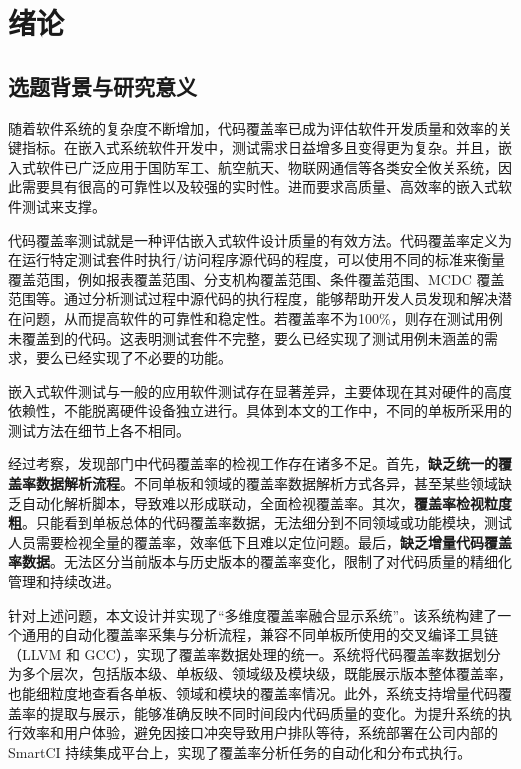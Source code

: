 
\chapter{绪论}

\section{选题背景与研究意义}
    随着软件系统的复杂度不断增加，代码覆盖率已成为评估软件开发质量和效率的关键指标。在嵌入式系统软件开发中，测试需求日益增多且变得更为复杂。并且，嵌入式软件已广泛应用于国防军工、航空航天、物联网通信等各类安全攸关系统，因此需要具有很高的可靠性以及较强的实时性\cite{杨丰玉2021嵌入式软件测试研究综述}\cite{孙琪明2025嵌入式软件模糊测试研究综述}。进而要求高质量、高效率的嵌入式软件测试来支撑。

    代码覆盖率测试就是一种评估嵌入式软件设计质量的有效方法。代码覆盖率定义为在运行特定测试套件时执行/访问程序源代码的程度，可以使用不同的标准来衡量覆盖范围，例如报表覆盖范围、分支机构覆盖范围、条件覆盖范围、MCDC 覆盖范围等\cite{Weiss2024AchievingCS}。通过分析测试过程中源代码的执行程度，能够帮助开发人员发现和解决潜在问题，从而提高软件的可靠性和稳定性。若覆盖率不为100\%，则存在测试用例未覆盖到的代码。这表明测试套件不完整，要么已经实现了测试用例未涵盖的需求，要么已经实现了不必要的功能\cite{Weiss2024AchievingCS}。
    
    嵌入式软件测试与一般的应用软件测试存在显著差异，主要体现在其对硬件的高度依赖性，不能脱离硬件设备独立进行\cite{刘栋2022基于覆盖率的嵌入式软件测试方法研究}。具体到本文的工作中，不同的单板所采用的测试方法在细节上各不相同。

    经过考察，发现部门中代码覆盖率的检视工作存在诸多不足。首先，\textbf{缺乏统一的覆盖率数据解析流程}。不同单板和领域的覆盖率数据解析方式各异，甚至某些领域缺乏自动化解析脚本，导致难以形成联动，全面检视覆盖率。其次，\textbf{覆盖率检视粒度粗}。只能看到单板总体的代码覆盖率数据，无法细分到不同领域或功能模块，测试人员需要检视全量的覆盖率，效率低下且难以定位问题。最后，\textbf{缺乏增量代码覆盖率数据}。无法区分当前版本与历史版本的覆盖率变化，限制了对代码质量的精细化管理和持续改进。

    针对上述问题，本文设计并实现了“多维度覆盖率融合显示系统”。该系统构建了一个通用的自动化覆盖率采集与分析流程，兼容不同单板所使用的交叉编译工具链（LLVM 和 GCC），实现了覆盖率数据处理的统一。系统将代码覆盖率数据划分为多个层次，包括版本级、单板级、领域级及模块级，既能展示版本整体覆盖率，也能细粒度地查看各单板、领域和模块的覆盖率情况。此外，系统支持增量代码覆盖率的提取与展示，能够准确反映不同时间段内代码质量的变化。为提升系统的执行效率和用户体验，避免因接口冲突导致用户排队等待，系统部署在公司内部的 SmartCI 持续集成平台上，实现了覆盖率分析任务的自动化和分布式执行。

